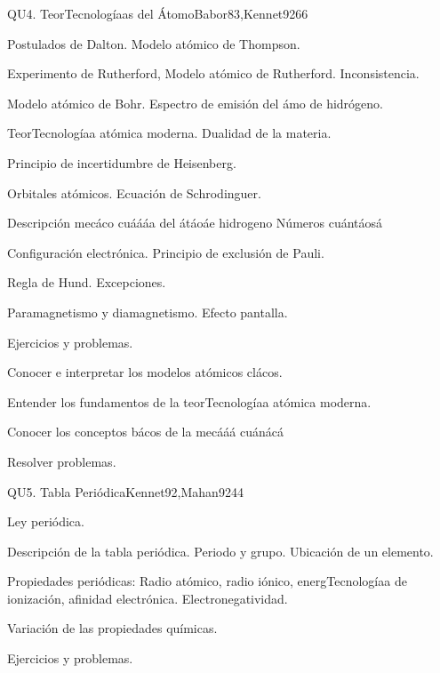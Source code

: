 \begin{syllabus}
\begin{unit}{}{QU4. TeorTecnologíaas del Átomo}{Babor83,Kennet92}{6}{6}
\begin{topics}
      \item Postulados de Dalton. Modelo atómico de Thompson.
      \item Experimento de Rutherford, Modelo atómico de Rutherford. Inconsistencia.
      \item Modelo atómico de Bohr. Espectro de emisión del ámo de hidrógeno.
      \item TeorTecnologíaa atómica moderna. Dualidad de la materia.
      \item Principio de incertidumbre de Heisenberg.
      \item Orbitales atómicos. Ecuación de Schrodinguer.
      \item Descripción mecáco cuáááa del átáoáe hidrogeno Números cuántáosá
      \item Configuración electrónica. Principio de exclusión de Pauli.
      \item Regla de Hund. Excepciones.
      \item Paramagnetismo y diamagnetismo. Efecto pantalla.
      \item Ejercicios y problemas.
   \end{topics}

   \begin{learningoutcomes}
      \item Conocer e interpretar los modelos atómicos clácos.
      \item Entender los fundamentos de la teorTecnologíaa atómica moderna.
      \item Conocer los conceptos bácos de la mecááá cuánácá
      \item Resolver problemas.
   \end{learningoutcomes}
\end{unit}

\begin{unit}{}{QU5. Tabla Periódica}{Kennet92,Mahan92}{4}{4}
\begin{topics}
	\item Ley periódica.
	\item Descripción de la tabla periódica. Periodo y grupo. Ubicación de un elemento.
	\item Propiedades periódicas: Radio atómico, radio iónico, energTecnologíaa de ionización, afinidad electrónica. Electronegatividad.
	\item Variación de las propiedades químicas.
	\item Ejercicios y problemas.
   \end{topics}


\end{unit}
\end{syllabus}
